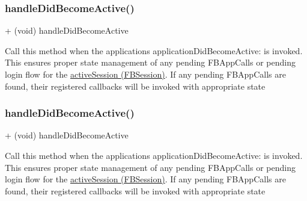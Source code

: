 \subsubsection{\texorpdfstring{handle\+Did\+Become\+Active()}{handleDidBecomeActive()}\hspace{0.1cm}{\footnotesize\ttfamily [4/5]}}
{\footnotesize\ttfamily + (void) handle\+Did\+Become\+Active \begin{DoxyParamCaption}{ }\end{DoxyParamCaption}}

Call this method when the application\textquotesingle{}s application\+Did\+Become\+Active\+: is invoked. This ensures proper state management of any pending F\+B\+App\+Calls or pending login flow for the \hyperlink{interfaceFBSession_aaf6863ab39e2f67733792453874d3870}{active\+Session (\+F\+B\+Session)}. If any pending F\+B\+App\+Calls are found, their registered callbacks will be invoked with appropriate state \mbox{\label{interfaceFBAppCall_ae38f6595e03e0ba2c44670e7ff579a70}} 
\subsubsection{\texorpdfstring{handle\+Did\+Become\+Active()}{handleDidBecomeActive()}\hspace{0.1cm}{\footnotesize\ttfamily [5/5]}}
{\footnotesize\ttfamily + (void) handle\+Did\+Become\+Active \begin{DoxyParamCaption}{ }\end{DoxyParamCaption}}

Call this method when the application\textquotesingle{}s application\+Did\+Become\+Active\+: is invoked. This ensures proper state management of any pending F\+B\+App\+Calls or pending login flow for the \hyperlink{interfaceFBSession_aaf6863ab39e2f67733792453874d3870}{active\+Session (\+F\+B\+Session)}. If any pending F\+B\+App\+Calls are found, their registered callbacks will be invoked with appropriate state \mbox{\label{interfaceFBAppCall_aa00467d180eab724577daeeb205524a4}} 
